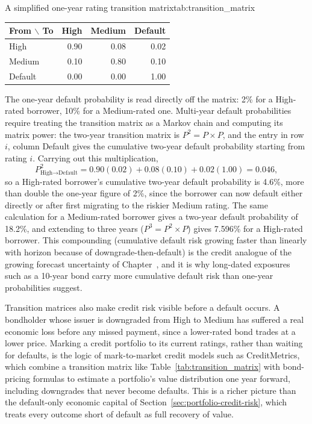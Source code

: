 \documentclass[../ai_in_finance]{subfiles}
\begin{document}
\begin{booktable}[htbp]{A simplified one-year rating transition matrix}{tab:transition_matrix}
\begin{tabular}{lrrr}
\toprule
From $\backslash$ To & High & Medium & Default \\
\midrule
High    & 0.90 & 0.08 & 0.02 \\
Medium  & 0.10 & 0.80 & 0.10 \\
Default & 0.00 & 0.00 & 1.00 \\
\bottomrule
\end{tabular}
\end{booktable}

The one-year default probability is read directly off the matrix: 2\% for a High-rated borrower, 10\% for a Medium-rated one. Multi-year default probabilities require treating the transition matrix as a Markov chain and computing its matrix power: the two-year transition matrix is $P^2 = P \times P$, and the entry in row $i$, column Default gives the cumulative two-year default probability starting from rating $i$. Carrying out this multiplication,
\begin{equation*}
P^2_{\text{High}\to\text{Default}} = 0.90(0.02) + 0.08(0.10) + 0.02(1.00) = 0.046,
\end{equation*}
so a High-rated borrower's cumulative two-year default probability is 4.6\%, more than double the one-year figure of 2\%, since the borrower can now default either directly or after first migrating to the riskier Medium rating.
The same calculation for a Medium-rated borrower gives a two-year default probability of 18.2\%, and extending to three years ($P^3 = P^2 \times P$) gives 7.596\% for a High-rated borrower. This compounding (cumulative default risk growing faster than linearly with horizon because of downgrade-then-default) is the credit analogue of the growing forecast uncertainty of Chapter~, and it is why long-dated exposures such as a 10-year bond carry more cumulative default risk than one-year probabilities suggest.

Transition matrices also make credit risk visible before a default occurs. A bondholder whose issuer is downgraded from High to Medium has suffered a real economic loss before any missed payment, since a lower-rated bond trades at a lower price. Marking a credit portfolio to its current ratings, rather than waiting for defaults, is the logic of mark-to-market credit models such as CreditMetrics, which combine a transition matrix like Table~\ref{tab:transition_matrix} with bond-pricing formulas to estimate a portfolio's value distribution one year forward, including downgrades that never become defaults.
This is a richer picture than the default-only economic capital of Section~\ref{sec:portfolio-credit-risk}, which treats every outcome short of default as full recovery of value.
\end{document}
